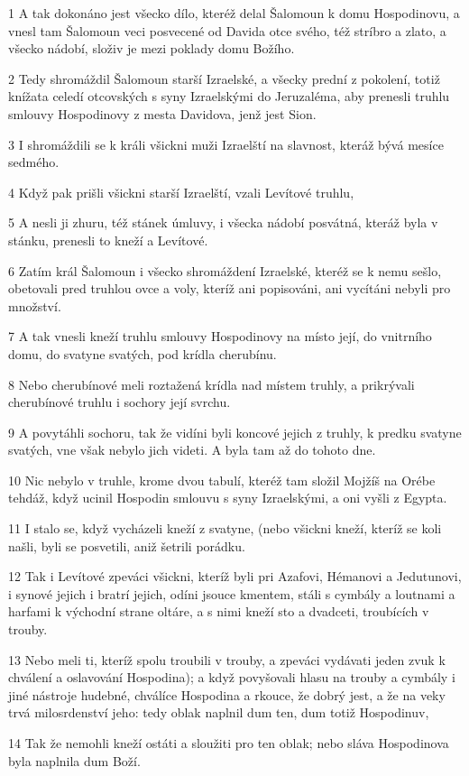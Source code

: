 \par 1 A tak dokonáno jest všecko dílo, kteréž delal Šalomoun k domu Hospodinovu, a vnesl tam Šalomoun veci posvecené od Davida otce svého, též stríbro a zlato, a všecko nádobí, složiv je mezi poklady domu Božího.
\par 2 Tedy shromáždil Šalomoun starší Izraelské, a všecky prední z pokolení, totiž knížata celedí otcovských s syny Izraelskými do Jeruzaléma, aby prenesli truhlu smlouvy Hospodinovy z mesta Davidova, jenž jest Sion.
\par 3 I shromáždili se k králi všickni muži Izraelští na slavnost, kteráž bývá mesíce sedmého.
\par 4 Když pak prišli všickni starší Izraelští, vzali Levítové truhlu,
\par 5 A nesli ji zhuru, též stánek úmluvy, i všecka nádobí posvátná, kteráž byla v stánku, prenesli to kneží a Levítové.
\par 6 Zatím král Šalomoun i všecko shromáždení Izraelské, kteréž se k nemu sešlo, obetovali pred truhlou ovce a voly, kteríž ani popisováni, ani vycítáni nebyli pro množství.
\par 7 A tak vnesli kneží truhlu smlouvy Hospodinovy na místo její, do vnitrního domu, do svatyne svatých, pod krídla cherubínu.
\par 8 Nebo cherubínové meli roztažená krídla nad místem truhly, a prikrývali cherubínové truhlu i sochory její svrchu.
\par 9 A povytáhli sochoru, tak že vidíni byli koncové jejich z truhly, k predku svatyne svatých, vne však nebylo jich videti. A byla tam až do tohoto dne.
\par 10 Nic nebylo v truhle, krome dvou tabulí, kteréž tam složil Mojžíš na Orébe tehdáž, když ucinil Hospodin smlouvu s syny Izraelskými, a oni vyšli z Egypta.
\par 11 I stalo se, když vycházeli kneží z svatyne, (nebo všickni kneží, kteríž se koli našli, byli se posvetili, aniž šetrili porádku.
\par 12 Tak i Levítové zpeváci všickni, kteríž byli pri Azafovi, Hémanovi a Jedutunovi, i synové jejich i bratrí jejich, odíni jsouce kmentem, stáli s cymbály a loutnami a harfami k východní strane oltáre, a s nimi kneží sto a dvadceti, troubících v trouby.
\par 13 Nebo meli ti, kteríž spolu troubili v trouby, a zpeváci vydávati jeden zvuk k chválení a oslavování Hospodina); a když povyšovali hlasu na trouby a cymbály i jiné nástroje hudebné, chválíce Hospodina a rkouce, že dobrý jest, a že na veky trvá milosrdenství jeho: tedy oblak naplnil dum ten, dum totiž Hospodinuv,
\par 14 Tak že nemohli kneží ostáti a sloužiti pro ten oblak; nebo sláva Hospodinova byla naplnila dum Boží.

